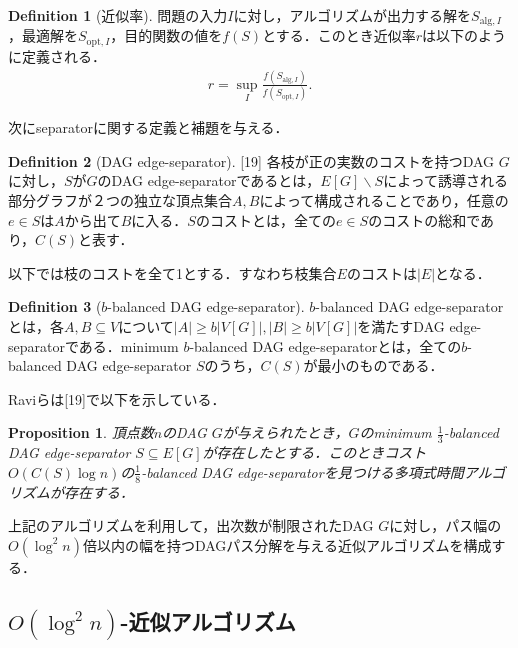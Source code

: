 \documentclass[master]{kuisthesis}		%
\theoremstyle{plain}
\newtheorem{proposition}{Proposition}
\theoremstyle{definition}
\newtheorem{definition*}{Definition}
\begin{document}
\begin{definition*}[近似率]
    問題の入力$I$に対し，アルゴリズムが出力する解を$S_{\mathrm{alg}, I}$，最適解を$S_{\mathrm{opt}, I}$，目的関数の値を$f(S)$とする．このとき近似率$r$は以下のように定義される．
    \begin{align*}
        r = \sup_{I}\frac{f(S_{\mathrm{alg}, I})}{f(S_{\mathrm{opt}, I})}.
    \end{align*}
    
\end{definition*}


次にseparatorに関する定義と補題を与える．


\begin{definition*}[DAG edge-separator][19]
    各枝が正の実数のコストを持つDAG $G$に対し，$S$が$G$のDAG edge-separatorであるとは，$E[G]\backslash S$によって誘導される部分グラフが２つの独立な頂点集合$A, B$によって構成されることであり，任意の$e \in S$は$A$から出て$B$に入る．$S$のコストとは，全ての$e \in S$のコストの総和であり，$C(S)$と表す．
\end{definition*}

以下では枝のコストを全て1とする．すなわち枝集合$E$のコストは$|E|$となる．

\begin{definition*}[$b$-balanced DAG edge-separator]
    $b$-balanced DAG edge-separatorとは，各$A, B\subseteq V$について$|A| \geq b|V[G]|, |B| \geq b|V[G]|$を満たすDAG edge-separatorである．minimum $b$-balanced DAG edge-separatorとは，全ての$b$-balanced DAG edge-separator $S$のうち，$C(S)$が最小のものである．
\end{definition*}

Raviらは[19]で以下を示している．

\begin{proposition}\label{separator_algorithm}
    頂点数$n$のDAG $G$が与えられたとき，$G$のminimum $\frac{1}{3}$-balanced DAG edge-separator $S\subseteq E[G]$が存在したとする．このときコスト$O(C(S) \log n)$の$\frac{1}{8}$-balanced DAG edge-separatorを見つける多項式時間アルゴリズムが存在する．
\end{proposition}

上記のアルゴリズムを利用して，出次数が制限されたDAG $G$に対し，パス幅の$O(\log ^2 n)$倍以内の幅を持つDAGパス分解を与える近似アルゴリズムを構成する．



\subsection{$O(\log ^2 n)$-近似アルゴリズム}
\end{document}
